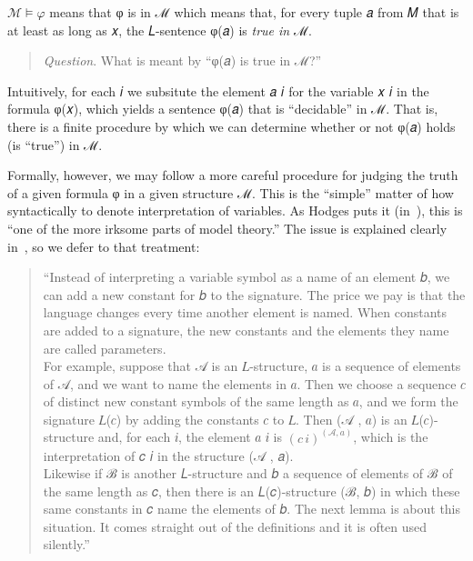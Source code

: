 \documentclass[a4paper,UKenglish,cleveref,autoref,thm-restate,12pt]{lipics-v2021-wjd}
\newcommand{\<}{\langle}
\renewcommand{\>}{\rangle}
\begin{document}
\(ℳ \models φ\) means that φ is  in ℳ which means that, for every
tuple 𝑎 from 𝑀 that is at least as long as 𝑥, the 𝐿-sentence φ(𝑎) is \emph{true in} ℳ.

\begin{quote}
\textit{Question}. What is meant by ``φ(𝑎) is true in ℳ?''
\end{quote}

Intuitively, for each 𝑖 we subsitute the element 𝑎 𝑖 for the
variable 𝑥 𝑖 in the formula φ(𝑥), which yields a sentence φ(𝑎) that is
``decidable'' in ℳ. That is, there is a finite procedure by which we can
determine whether or not φ(𝑎) holds (is ``true'') in ℳ.

Formally, however, we may follow a more careful procedure for judging the truth
of a given formula φ in a given structure ℳ. This is the ``simple'' matter of how
syntactically to denote interpretation of variables. As Hodges puts it (in~\cite{Hodges:1993}), this
is ``one of the more irksome parts of model theory.'' The issue is explained
clearly in~\cite[Section 1.4]{Hodges:1993}, so we defer to that treatment:

\begin{quote}
  ``Instead of interpreting a variable symbol as a name of an element 𝑏,
  we can add a new constant for 𝑏 to the signature. The price we pay is that the language
  changes every time another element is named. When constants are added to a
  signature, the new constants and the elements they name are called parameters.\\[6pt]
For example, suppose that 𝒜 is an 𝐿-structure, 𝑎 is a sequence of elements of 𝒜,
and we want to name the elements in 𝑎. Then we choose a sequence 𝑐 of distinct
new constant symbols of the same length as 𝑎, and we form the signature 𝐿(𝑐) by
adding the constants 𝑐 to 𝐿. Then (𝒜 , 𝑎) is an 𝐿(𝑐)-structure and, for each 𝑖,
the element 𝑎 𝑖 is \((𝑐\, i)^{(𝒜, 𝑎)}\), which is the interpretation of 𝑐 𝑖 in
the structure (𝒜 , 𝑎).\\[6pt]
Likewise if ℬ is another 𝐿-structure and 𝑏 a sequence of elements of ℬ of the
same length as 𝑐, then there is an 𝐿(𝑐)-structure (ℬ, 𝑏) in which these same
constants in 𝑐 name the elements of 𝑏. The next lemma is about this situation.
It comes straight out of the definitions and it is often used silently.''
\end{quote}
\end{document}
